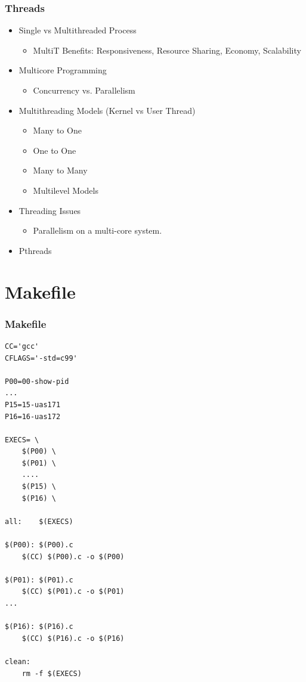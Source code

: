 \documentclass[aspectratio=169, xcolor=table, notheorems, hyperref={pdfpagelabels=false}]{beamer}
\begin{document}
\begin{frame}
\frametitle{Threads}
\begin{itemize}
\item Single vs Multithreaded Process
\begin{itemize}
\item MultiT Benefits: Responsiveness, Resource Sharing, Economy, Scalability
\end{itemize}
\item Multicore Programming
\begin{itemize}
\item Concurrency vs. Parallelism
\end{itemize}
\item Multithreading Models (Kernel vs User Thread)
\begin{itemize}
\item Many to One
\item One to One
\item Many to Many
\item Multilevel Models
\end{itemize}
\item Threading Issues
\begin{itemize}
\item Parallelism on a multi-core system.
\end{itemize}
\item Pthreads
\end{itemize}
\end{frame}

\section{Makefile}
\begin{frame}[fragile]
\frametitle{Makefile}
\begin{lstlisting}[basicstyle=\ttfamily\tiny]
CC='gcc'
CFLAGS='-std=c99'
 
P00=00-show-pid
...
P15=15-uas171
P16=16-uas172

EXECS= \
	$(P00) \
	$(P01) \
	....
	$(P15) \
	$(P16) \

all:	$(EXECS)

$(P00): $(P00).c
	$(CC) $(P00).c -o $(P00)

$(P01): $(P01).c
	$(CC) $(P01).c -o $(P01)
...

$(P16): $(P16).c
	$(CC) $(P16).c -o $(P16)

clean:
	rm -f $(EXECS)
\end{lstlisting}
\end{frame}
\end{document}
